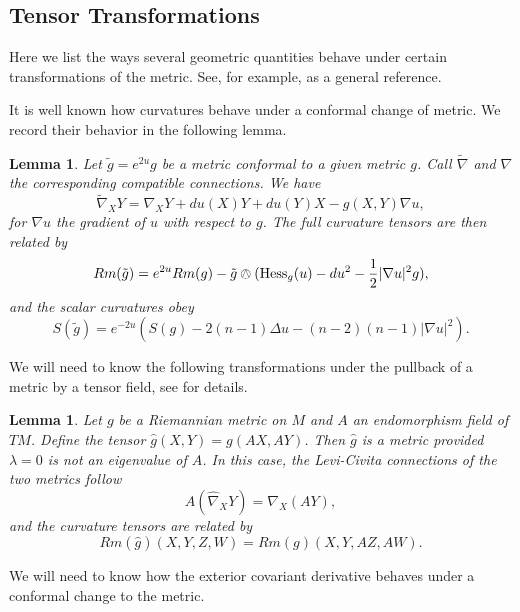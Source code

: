\documentclass{amsart}
\newtheorem{lem}[thm]{Lemma}
\begin{document}
\subsection{Tensor Transformations}

Here we list the ways several geometric quantities behave under certain transformations of the metric.
See, for example, \cite{Lee2018} as a general reference.

It is well known how curvatures behave under a conformal change of metric.
We record their behavior in the following lemma.


\begin{lem}
\label{ConfChange}
Let $\tilde{g} = e^{2u}g$ be a metric conformal to a given metric $g$.
Call $\widetilde{\nabla}$ and $\nabla$ the corresponding compatible connections.
We have 
\[
\widetilde{\nabla}_XY = \nabla_XY + du(X)Y + du(Y)X - g(X,Y)\nabla u,
\]
for $\nabla u$ the gradient of $u$ with respect to $g$.
The full curvature tensors are then related by
\[
Rm(\tilde{g}) = e^{2u}Rm(g) - \tilde{g}\owedge(\mathrm{Hess}_g(u) - du^2 - \frac{1}{2}|\nabla u|^2g),
\]
and the scalar curvatures obey
\[
S(\tilde{g}) = e^{-2u}(S(g) -2(n-1)\Delta u  - (n-2)(n-1)|\nabla u|^2).
\]
\end{lem}

We will need to know the following transformations under the pullback of a metric by a tensor field, see \cite{Bridgeman-Bromberg2022} for details.

\begin{lem}
\label{TensorChange}
Let $g$ be a Riemannian metric on $M$ and $A$ an endomorphism field of $TM$.
Define the tensor $\hat{g}(X,Y) = g(AX,AY)$.
Then $\hat{g}$ is a metric provided $\lambda = 0$ is not an eigenvalue of $A$. 
In this case, the Levi-Civita connections of the two metrics follow
\[
A (\widehat{\nabla}_XY) = \nabla_X(AY),
\]
and the curvature tensors are related by 
\[
Rm(\hat{g})(X,Y,Z,W) = Rm(g)(X,Y,AZ,AW).
\]
\end{lem}

We will need to know how the exterior covariant derivative behaves under a conformal change to the metric.
\end{document}
